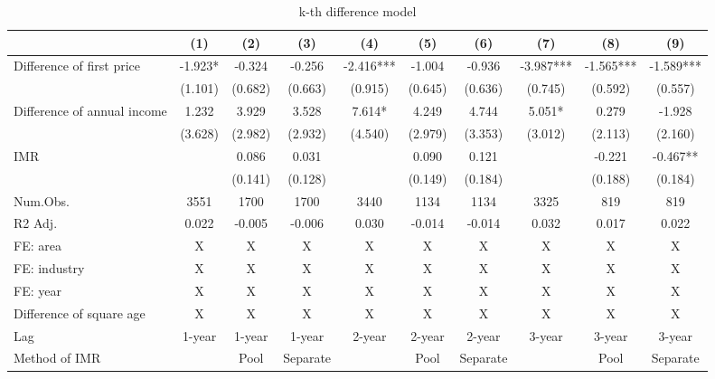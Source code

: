 \documentclass[
  11pt,
  a4paper,
]{article}
\begin{document}
\begin{table}

\caption{\label{tab:kdiffbenchmark}k-th difference model}
\centering
\begin{tabular}[t]{lccccccccc}
\toprule
  & (1) & (2) & (3) & (4) & (5) & (6) & (7) & (8) & (9)\\
\midrule
Difference of first price & -1.923* & -0.324 & -0.256 & -2.416*** & -1.004 & -0.936 & -3.987*** & -1.565*** & -1.589***\\
 & (1.101) & (0.682) & (0.663) & (0.915) & (0.645) & (0.636) & (0.745) & (0.592) & (0.557)\\
Difference of annual income & 1.232 & 3.929 & 3.528 & 7.614* & 4.249 & 4.744 & 5.051* & 0.279 & -1.928\\
 & (3.628) & (2.982) & (2.932) & (4.540) & (2.979) & (3.353) & (3.012) & (2.113) & (2.160)\\
IMR &  & 0.086 & 0.031 &  & 0.090 & 0.121 &  & -0.221 & -0.467**\\
 &  & (0.141) & (0.128) &  & (0.149) & (0.184) &  & (0.188) & (0.184)\\
\midrule
Num.Obs. & 3551 & 1700 & 1700 & 3440 & 1134 & 1134 & 3325 & 819 & 819\\
R2 Adj. & 0.022 & -0.005 & -0.006 & 0.030 & -0.014 & -0.014 & 0.032 & 0.017 & 0.022\\
FE: area & X & X & X & X & X & X & X & X & X\\
FE: industry & X & X & X & X & X & X & X & X & X\\
FE: year & X & X & X & X & X & X & X & X & X\\
Difference of square age & X & X & X & X & X & X & X & X & X\\
Lag & 1-year & 1-year & 1-year & 2-year & 2-year & 2-year & 3-year & 3-year & 3-year\\
Method of IMR &  & Pool & Separate &  & Pool & Separate &  & Pool & Separate\\
\bottomrule
\end{tabular}
\end{table}
\end{document}
